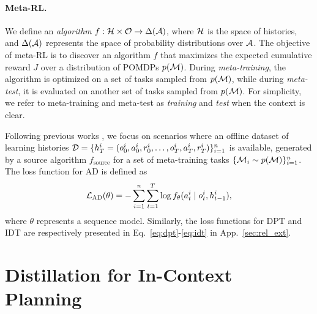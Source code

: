 \documentclass{article}
\begin{document}
\paragraph*{Meta-RL.}
We define an \emph{algorithm} $f : {\mathcal{H}} \times {\mathcal{O}} \rightarrow \Delta({\mathcal{A}})$, where ${\mathcal{H}}$ is the space of histories, and $\Delta({\mathcal{A}})$ represents the space of probability distributions over ${\mathcal{A}}$.
The objective of meta-RL is to discover an algorithm $f$ that maximizes the expected cumulative reward $J$ over a distribution of POMDPs $p({\mathcal{M}})$.
During \emph{meta-training}, the algorithm is optimized on a set of tasks sampled from $p({\mathcal{M}})$, while during \emph{meta-test}, it is evaluated on another set of tasks sampled from $p({\mathcal{M}})$.
For simplicity, we refer to meta-training and meta-test as \emph{training} and \emph{test} when the context is clear.

Following previous works \citep{AD, IDT}, we focus on scenarios where an offline dataset of learning histories ${\mathcal{D}} = \{h_T^i = (o_0^i, a_0^i, r_0^i, \dots, o_T^i, a_T^i, r_T^i)\}_{i=1}^n$ is available, generated by a source algorithm $f_\textrm{source}$ for a set of meta-training tasks $\{{\mathcal{M}}_i \sim p({\mathcal{M}})\}_{i=1}^n$.
The loss function for AD \citep{AD} is defined as
\begin{equation}
    {\mathcal{L}}_{\textrm{AD}}(\theta) = - \sum_{i=1}^n \sum_{t=1}^{T} \log f_\theta(a_t^i \mid o_t^i, h_{t-1}^i),
    \label{eq:ad}
\end{equation}
where $\theta$ represents a sequence model.
Similarly, the loss functions for DPT \citep{DPT} and IDT \citep{IDT} are respectively presented in Eq.~\ref{eq:dpt}-\ref{eq:idt} in App.~\ref{sec:rel_ext}.

\section{Distillation for In-Context Planning}
\label{sec:appr}
\end{document}
